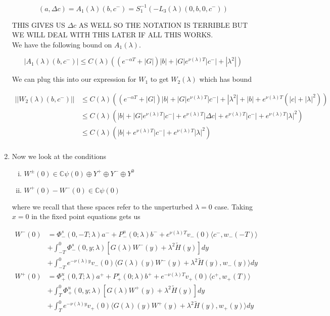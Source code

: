 \documentclass[12pt]{article}
\def\C{{\mathbb C}}
\begin{document}
\begin{enumerate}
\[
(a, \Delta c) = A_1(\lambda)(b, c^-) = S_1^{-1}(- L_3(\lambda)(0, b, 0, c^-))
\]

THIS GIVES US $\Delta c$ AS WELL SO THE NOTATION IS TERRIBLE BUT WE WILL DEAL WITH THIS LATER IF ALL THIS WORKS.\\

We have the following bound on $A_1(\lambda)$.

\[
|A_1(\lambda)(b, c^-)| \leq C(\lambda)( (e^{-\alpha T} + |G|)|b| + |G|e^{\nu(\lambda)T}|c^-| + |\lambda^2|)
\]

We can plug this into our expression for $W_1$ to get $W_2(\lambda)$ which has bound

\begin{align*}
||W_2(\lambda)(b, c^-)|| &\leq C(\lambda) ((e^{-\alpha T} + |G|)|b| + |G|e^{\nu(\lambda)T}|c^-| + |\lambda^2|+ |b| + e^{\nu(\lambda)T}(|c| + |\lambda|^2)) \\
&\leq C(\lambda) (|b| + |G|e^{\nu(\lambda)T}|c^-| + e^{\nu(\lambda)T}|\Delta c| + e^{\nu(\lambda)T}|c^-| + e^{\nu(\lambda)T}|\lambda|^2) \\
&\leq C(\lambda) (|b| + e^{\nu(\lambda)T}|c^-| + e^{\nu(\lambda)T}|\lambda|^2) \\
\end{align*}


\item Now we look at the conditions

\begin{enumerate}[(i)]
\item $W^\pm(0) \in \C \psi(0) \oplus Y^+ \oplus Y^- \oplus Y^0$
\item $W^+(0) - W^-(0) \in \C \psi(0) $ 
\end{enumerate}

where we recall that these spaces refer to the unperturbed $\lambda = 0$ case. Taking $x = 0$ in the fixed point equations gets us

\begin{align*}
W^-(0) &= \Phi^s_-(0, -T; \lambda)a^- + P^u_-(0; \lambda)b^- + e^{\nu(\lambda)T} v_-(0) \langle c^-, w_-(-T) \rangle \\
&+ \int_{-T}^0 \Phi^s_-(0, y; \lambda) [ G(\lambda)W^-(y) + \lambda^2 \tilde{H}(y) ] dy \\
&+ \int_{-T}^0 
e^{-\nu(\lambda)y} v_-(0) \langle G(\lambda)(y)W^-(y) + \lambda^2 \tilde{H}(y), w_-(y) \rangle dy \\
W^+(0) &= \Phi^u_+(0, T; \lambda)a^+ + P^s_+(0; \lambda)b^+ + e^{-\nu(\lambda)T} v_+(0) \langle c^+, w_+(T) \rangle \\
&+ \int_T^0 \Phi^u_+(0, y; \lambda) [ G(\lambda)W^+(y) + \lambda^2 \tilde{H}(y) ] dy \\
&+ \int_T^0 e^{-\nu(\lambda)y} v_+(0) \langle G(\lambda)(y)W^+(y) + \lambda^2 \tilde{H}(y), w_+(y) \rangle dy
\end{align*}


\end{enumerate}
\end{document}
